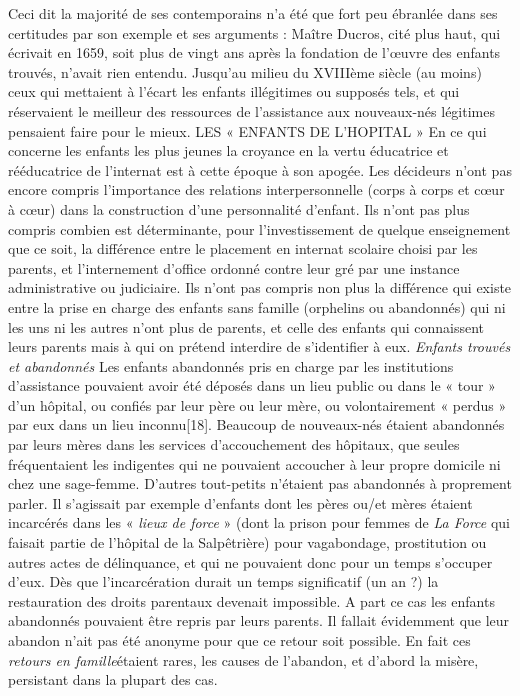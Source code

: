  Ceci dit la majorité de ses contemporains n'a été que fort peu ébranlée dans ses certitudes par son exemple et ses arguments : Maître Ducros, cité plus haut, qui écrivait en 1659, soit plus de vingt ans après la fondation de l'œuvre des enfants trouvés, n'avait rien entendu. Jusqu'au milieu du XVIIIème siècle (au moins) ceux qui mettaient à l'écart les enfants illégitimes ou supposés tels, et qui réservaient le meilleur des ressources de l'assistance aux nouveaux-nés légitimes pensaient faire pour le mieux. 
LES « ENFANTS DE L'HOPITAL »
 En ce qui concerne les enfants les plus jeunes la croyance en la vertu éducatrice et rééducatrice de l'internat est à cette époque à son apogée. Les décideurs n'ont pas encore compris l'importance des relations interpersonnelle (corps à corps et cœur à cœur) dans la construction d'une personnalité d'enfant. Ils n'ont pas plus compris combien est déterminante, pour l'investissement de quelque enseignement que ce soit, la différence entre le placement en internat scolaire choisi par les parents, et l'internement d'office ordonné contre leur gré par une instance administrative ou judiciaire. Ils n'ont pas compris non plus la différence qui existe entre la prise en charge des enfants sans famille (orphelins ou abandonnés) qui ni les uns ni les autres n'ont plus de parents, et celle des enfants qui connaissent leurs parents mais à qui on prétend interdire de s'identifier à eux. 
\emph{Enfants trouvés et abandonnés 
}Les enfants abandonnés pris en charge par les institutions d'assistance pouvaient avoir été déposés dans un lieu public ou dans le « tour » d'un hôpital, ou confiés par leur père ou leur mère, ou volontairement « perdus » par eux dans un lieu inconnu[18]. Beaucoup de nouveaux-nés étaient abandonnés par leurs mères dans les services d'accouchement des hôpitaux, que seules fréquentaient les indigentes qui ne pouvaient accoucher à leur propre domicile ni chez une sage-femme. D'autres tout-petits n'étaient pas abandonnés à proprement parler. Il s'agissait par exemple d'enfants dont les pères ou/et mères étaient incarcérés dans les « \emph{lieux de force} » (dont la prison pour femmes de \emph{La Force} qui faisait partie de l'hôpital de la Salpêtrière) pour vagabondage, prostitution ou autres actes de délinquance, et qui ne pouvaient donc pour un temps s'occuper d'eux. Dès que l'incarcération durait un temps significatif (un an ?) la restauration des droits parentaux devenait impossible. 
 A part ce cas les enfants abandonnés pouvaient être repris par leurs parents. Il fallait évidemment que leur abandon n'ait pas été anonyme pour que ce retour soit possible. En fait ces \emph{retours en famille}étaient rares, les causes de l'abandon, et d'abord la misère, persistant dans la plupart des cas.
